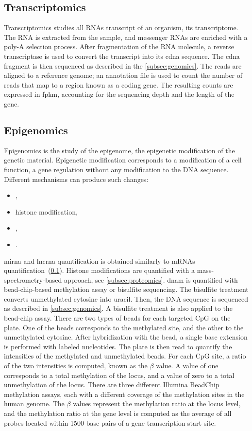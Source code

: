 \documentclass[../main.tex]{subfiles}
\begin{document}
 \subsection{Transcriptomics}\label{subsec:transcriptomics}
	 Transcriptomics studies all RNAs transcript of an organism, \ie{}its transcriptome.
	 The RNA is extracted from the sample, and messenger RNAs are enriched with a poly-A selection process.
	 After fragmentation of the RNA molecule, a reverse transcriptase is used to convert the transcript into its \gls{cdna} sequence.
	 The \gls{cdna} fragment is then sequenced as described in the \cref{subsec:genomics}.
	 The reads are aligned to a reference genome; an annotation file is used to count the number of reads that map to a region known as a coding gene.
	 The resulting counts are expressed in \gls{fpkm}, accounting for the sequencing depth and the length of the gene.

 \subsection{Epigenomics}
	 Epigenomics is the study of the epigenome, the epigenetic modification of the genetic material.
	 Epigenetic modification corresponds to a modification of a cell function, a gene regulation without any modification to the DNA sequence.
	 Different mechanisms can produce such changes:
	 \begin{itemize}[nosep]
		 \item {},
		 \item histone modification,
		 \item {},
		 \item {}.
	 \end{itemize}
	 \Gls{mirna} and \gls{lncrna} quantification is obtained similarly to mRNAs quantification~(\cref{subsec:transcriptomics}).
	 Histone modifications are quantified with a mass-spectrometry-based approach, see \cref{subsec:proteomics}.
	 \Gls{dnam} is quantified with bead-chip-based methylation assay or bisulfite sequencing.
	 The bisulfite treatment converts unmethylated cytosine into uracil.
	 Then, the DNA sequence is sequenced as described in \cref{subsec:genomics}.
	 A bisulfite treatment is also applied to the bead-chip assay.
	 There are two types of beads for each targeted CpG on the plate.
	 One of the beads corresponds to the methylated site, and the other to the unmethylated cytosine.
	 After hybridization with the bead, a single base extension is performed with labeled nucleotides.
	 The plate is then read to quantify the intensities of the methylated and unmethylated beads.
	 For each CpG site, a ratio of the two intensities is computed, known as the \(\beta\) value.
	 A value of one corresponds to a total methylation of the locus, and a value of zero to a total unmethylation of the locus.
	 There are three different Illumina BeadChip methylation assays, each with a different coverage of the methylation sites in the human genome.
	 The \(\beta\) values represent the methylation ratio at the locus level, and the methylation ratio at the gene level is computed as the average of all probes located within 1500 base pairs of a gene transcription start site.
\end{document}
